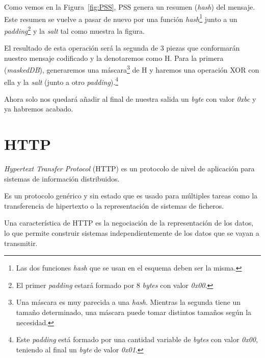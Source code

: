 Como vemos en la Figura~\ref{fig:PSS}, PSS genera un resumen (\emph{hash}) del mensaje. Este resumen se vuelve a pasar de nuevo por una función \emph{hash}\footnote{Las dos funciones \emph{hash} que se usan en el esquema deben ser la misma.} junto a un \emph{padding}\footnote{El primer \emph{padding} estará formado por 8 \emph{bytes} con valor \emph{0x00}.} y la \emph{salt} tal como muestra la figura.

El resultado de esta operación será la segunda de 3 piezas que conformarán nuestro mensaje codificado y la denotaremos como H. Para la primera (\emph{maskedDB}), generaremos una máscara\footnote{Una máscara es muy parecida a una \emph{hash}. Mientras la segunda tiene un tamaño determinado, una máscara puede tomar distintos tamaños según la necesidad.} de H y haremos una operación XOR con ella y la \emph{salt} (junto a otro \emph{padding}).\footnote{Este \emph{padding} está formado por una cantidad variable de \emph{bytes} con valor \emph{0x00}, teniendo al final un \emph{byte} de valor \emph{0x01}.}

Ahora solo nos quedará añadir al final de nuestra salida un \emph{byte} con valor \emph{0xbc} y ya habremos acabado. \emph{\parencite{Reference17}}


\section{HTTP}

\emph{Hypertext Transfer Protocol} (HTTP) es un protocolo de nivel de aplicación para sistemas de información distribuidos.

Es un protocolo genérico y sin estado que es usado para múltiples tareas como la transferencia de hipertexto o la representación de sistemas de ficheros.

Una característica de HTTP es la negociación de la representación de los datos, lo que permite construir sistemas independientemente de los datos que se vayan a transmitir. \emph{\parencite{Reference18}}
